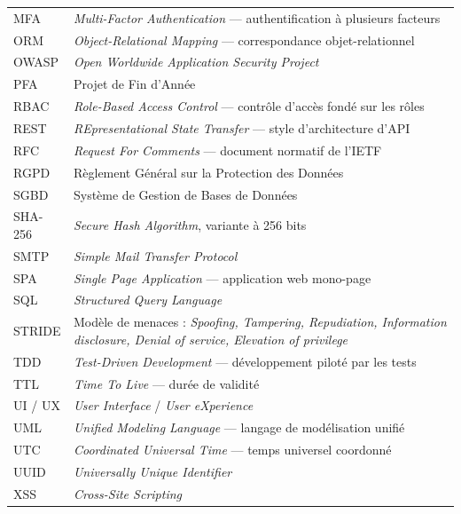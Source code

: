 \begin{center}
\begin{tabularx}{\textwidth}{L{2.6cm} X}
MFA     & \textit{Multi-Factor Authentication} --- authentification à plusieurs facteurs\\
ORM     & \textit{Object-Relational Mapping} --- correspondance objet-relationnel\\
OWASP   & \textit{Open Worldwide Application Security Project}\\
PFA     & Projet de Fin d'Année\\
RBAC    & \textit{Role-Based Access Control} --- contrôle d'accès fondé sur les rôles\\
REST    & \textit{REpresentational State Transfer} --- style d'architecture d'API\\
RFC     & \textit{Request For Comments} --- document normatif de l'IETF\\
RGPD    & Règlement Général sur la Protection des Données\\
SGBD    & Système de Gestion de Bases de Données\\
SHA-256 & \textit{Secure Hash Algorithm}, variante à 256 bits\\
SMTP    & \textit{Simple Mail Transfer Protocol}\\
SPA     & \textit{Single Page Application} --- application web mono-page\\
SQL     & \textit{Structured Query Language}\\
STRIDE  & Modèle de menaces : \textit{Spoofing, Tampering, Repudiation, Information disclosure, Denial of service, Elevation of privilege}\\
TDD     & \textit{Test-Driven Development} --- développement piloté par les tests\\
TTL     & \textit{Time To Live} --- durée de validité\\
UI / UX & \textit{User Interface} / \textit{User eXperience}\\
UML     & \textit{Unified Modeling Language} --- langage de modélisation unifié\\
UTC     & \textit{Coordinated Universal Time} --- temps universel coordonné\\
UUID    & \textit{Universally Unique Identifier}\\
XSS     & \textit{Cross-Site Scripting}\\
\bottomrule
\end{tabularx}
\end{center}
